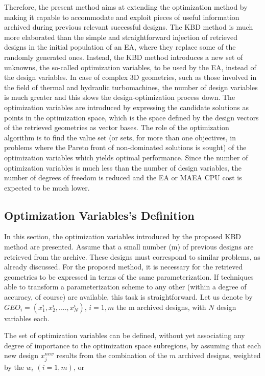 Therefore, the present method aims at extending the optimization method by making it capable to accommodate and exploit pieces of useful information archived during previous relevant successful designs. The KBD method is much more elaborated than the simple and straightforward injection of retrieved designs in the initial population of an EA, where they replace some of the randomly generated ones. Instead, the KBD method  introduces a new set of unknowns, the so-called optimization variables, to be used by the EA, instead of the design variables. In case of complex 3D geometries, such as those involved in the field of thermal and hydraulic turbomachines, the number of design variables is much greater and this slows the design-optimization process down. The optimization variables are introduced by expressing the candidate solutions as points in the optimization space, which is the space defined by the design vectors of the retrieved geometries as vector bases. The role of the optimization algorithm is to find the value set (or sets, for more than one objectives, in problems where the Pareto front of non-dominated solutions is sought) of the optimization variables which yields optimal performance. Since the number of optimization variables is much less than the number of design variables, the number of degrees of freedom is reduced and the EA or MAEA CPU cost is expected to be much lower.

\subsection{Optimization Variables's Definition}
In this section, the optimization variables introduced by the proposed KBD method are presented. Assume that a small number (m) of previous designs are retrieved from the archive. These designs must correspond to similar problems, as already discussed. For the proposed method, it is necessary  for the retrieved geometries to be expressed in terms of the same parameterization. If techniques able to transform a parameterization scheme to any other (within a degree of accuracy, of course) are available, this task is straightforward. Let us denote by $GEO_i=(x_1^i,x_2^i,....,x_N^i)$, $i\!=\!1,m$ the m archived designs, with $N$ design variables each.

The set of optimization variables can be defined, without yet associating any degree of importance to the optimization space subregions, by assuming that each new design $x_j^{new}$ results from the combination of the $m$ archived designs, weighted by the  $w_i$ $(i=1,m)$, or

